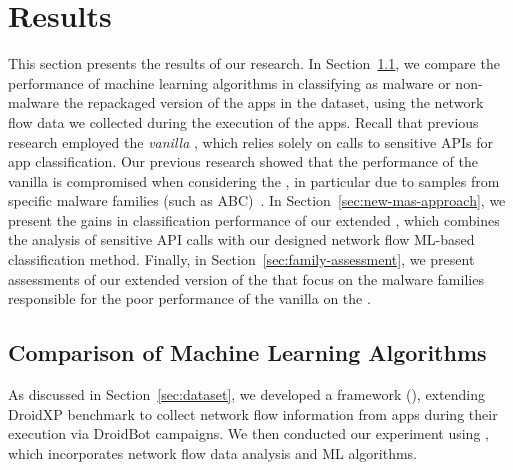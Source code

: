 \section{Results}\label{sec:results}

This section presents the results of our research. In Section~\ref{sec:ml}, we compare the
performance of machine learning algorithms in classifying as malware or non-malware the
repackaged version of the apps in the \cds dataset, using the network flow data we
collected during the execution of the apps. Recall that previous research employed the \emph{vanilla}
\mas, which relies solely on calls to sensitive APIs for app classification. Our previous
research showed that the performance of the vanilla \mas is compromised when considering
the \cds, in particular due to samples from specific malware families {\color{red}(such as ABC)~\cite{}}.
In Section~\ref{sec:new-mas-approach}, we present the gains in classification performance of our extended \mas,
which combines the analysis of sensitive API calls with our designed network flow ML-based classification method.
Finally, in Section~\ref{sec:family-assessment}, we present assessments of our extended
version of the \mas that focus on the malware families responsible for the poor performance of
the vanilla \mas on the \cds.

\subsection{Comparison of Machine Learning Algorithms}\label{sec:ml}

As discussed in Section~\ref{sec:dataset}, we developed a framework (\droidxpflow), extending DroidXP benchmark to collect network flow information from apps during their execution via DroidBot campaigns. We then conducted our experiment using \droidxpflow, which incorporates network flow data analysis and ML algorithms.


